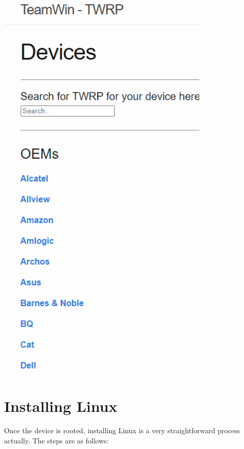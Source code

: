 \includegraphics[width=4in]{images/Capture}

\section{Installing Linux}
Once the device is rooted, installing Linux is a very straightforward process actually. The steps are as follows:

